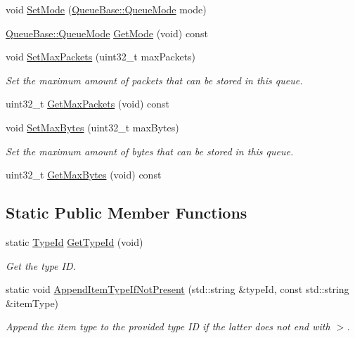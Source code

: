 \begin{DoxyCompactItemize}
void \hyperlink{classns3_1_1QueueBase_ad0961289c94853928a1cf69dd2d93e8d}{Set\+Mode} (\hyperlink{classns3_1_1QueueBase_adc473162c2a2bcb3d76d151d6d7ee02a}{Queue\+Base\+::\+Queue\+Mode} mode)
\item 
\hyperlink{classns3_1_1QueueBase_adc473162c2a2bcb3d76d151d6d7ee02a}{Queue\+Base\+::\+Queue\+Mode} \hyperlink{classns3_1_1QueueBase_a8f711a128861891658c52537d7645793}{Get\+Mode} (void) const 
\item 
void \hyperlink{classns3_1_1QueueBase_a5e7bd286a0c1008f4c65ab3c9a48abd9}{Set\+Max\+Packets} (uint32\+\_\+t max\+Packets)
\begin{DoxyCompactList}\small\item\em Set the maximum amount of packets that can be stored in this queue. \end{DoxyCompactList}\item 
uint32\+\_\+t \hyperlink{classns3_1_1QueueBase_a7e1501be3f36c87c57dc3e807f925a07}{Get\+Max\+Packets} (void) const 
\item 
void \hyperlink{classns3_1_1QueueBase_a65f35ec9f4405292011a57cc6d2f59f9}{Set\+Max\+Bytes} (uint32\+\_\+t max\+Bytes)
\begin{DoxyCompactList}\small\item\em Set the maximum amount of bytes that can be stored in this queue. \end{DoxyCompactList}\item 
uint32\+\_\+t \hyperlink{classns3_1_1QueueBase_adc3e321231c0b44b622242d65d2bdbd2}{Get\+Max\+Bytes} (void) const 
\end{DoxyCompactItemize}
\subsection*{Static Public Member Functions}
\begin{DoxyCompactItemize}
\item 
static \hyperlink{classns3_1_1TypeId}{Type\+Id} \hyperlink{classns3_1_1QueueBase_add3b6a5d65660fb27127044315fb62cd}{Get\+Type\+Id} (void)
\begin{DoxyCompactList}\small\item\em Get the type ID. \end{DoxyCompactList}\item 
static void \hyperlink{classns3_1_1QueueBase_a7b85284de63a5642e623f32d096dbcd9}{Append\+Item\+Type\+If\+Not\+Present} (std\+::string \&type\+Id, const std\+::string \&item\+Type)
\begin{DoxyCompactList}\small\item\em Append the item type to the provided type ID if the latter does not end with \textquotesingle{}$>$\textquotesingle{}. \end{DoxyCompactList}\end{DoxyCompactItemize}
